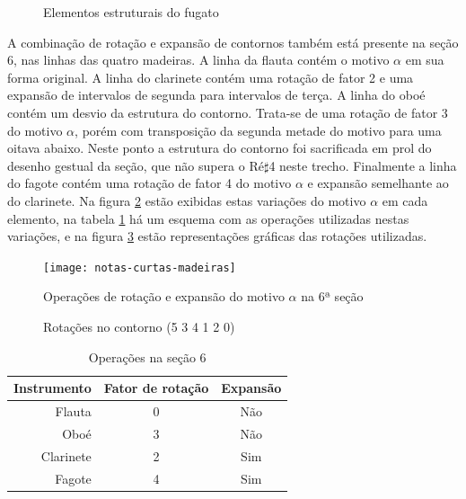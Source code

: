 \begin{figure}
  \centering

  \caption{Elementos estruturais do fugato}
  \label{fig:elementos-fugato}
\end{figure}

A combinação de rotação e expansão de contornos também está presente
na seção 6, nas linhas das quatro madeiras. A linha da flauta contém o
motivo $\alpha$ em sua forma original. A linha do clarinete contém uma
rotação de fator 2 e uma expansão de intervalos de segunda para
intervalos de terça. A linha do oboé contém um desvio da estrutura do
contorno. Trata-se de uma rotação de fator 3 do motivo $\alpha$, porém
com transposição da segunda metade do motivo para uma oitava
abaixo. Neste ponto a estrutura do contorno foi sacrificada em prol do
desenho gestual da seção, que não supera o Ré$\sharp$4 neste
trecho. Finalmente a linha do fagote contém uma rotação de fator 4 do
motivo $\alpha$ e expansão semelhante ao do clarinete. Na figura
\ref{fig:notas-curtas-madeiras} estão exibidas estas variações do
motivo $\alpha$ em cada elemento, na tabela
\ref{tab:operacoes-secao-6} há um esquema com as operações utilizadas
nestas variações, e na figura \ref{fig:rotacoes-534120} estão
representações gráficas das rotações utilizadas.

\begin{figure}
  \centering
    \texttt{[image: notas-curtas-madeiras]}
    \caption{Operações de rotação e expansão do motivo $\alpha$ na 6ª
    seção}
  \label{fig:notas-curtas-madeiras}
\end{figure}

\begin{figure}
  \centering
  \subfloat[Rotação 2: (4 1 2 0 5 3)]{
    \texttt{[image: c-412053]}
    \label{fig:412053}  
  }
  \subfloat[Rotação 3: (1 2 0 5 3 4)]{
    \texttt{[image: c-120534]}
    \label{fig:120534}  
  }
  \subfloat[Rotação 4: (2 0 5 3 4 1)]{
    \texttt{[image: c-205341]}
    \label{fig:205341}  
  }
  \caption{Rotações no contorno (5 3 4 1 2 0)}
  \label{fig:rotacoes-534120}
\end{figure}

\begin{table}
  \centering
  \begin{tabular}{r|cc}
    Instrumento & Fator de rotação & Expansão \\
    \hline
    Flauta & 0 & Não \\
    Oboé & 3 & Não \\
    Clarinete & 2 & Sim \\
    Fagote & 4 & Sim \\
  \end{tabular}
  \caption{Operações na seção 6}
  \label{tab:operacoes-secao-6}
\end{table}

